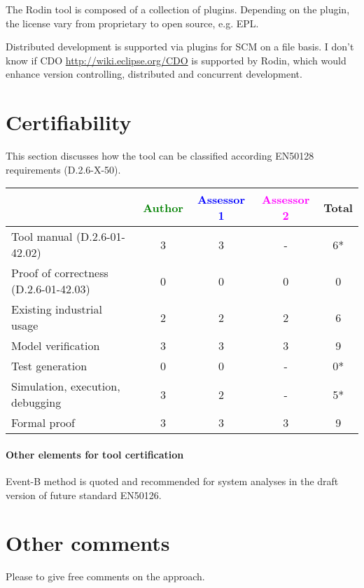 \begin{assessor2}
  The Rodin tool is composed of a collection of plugins. Depending on
  the plugin, the license vary from proprietary to open source,
  e.g. EPL.
\end{assessor2}

\begin{assessor2}
  Distributed development is supported via plugins for SCM on a file
  basis. I don't know if CDO \url{http://wiki.eclipse.org/CDO} is
  supported by Rodin, which would enhance version controlling,
  distributed and concurrent development.
\end{assessor2}

\section{Certifiability}

This section discusses how the tool can be classified according EN50128 requirements (D.2.6-X-50).


\begin{tabular}{|l | c | c | c | c|}
\hline
& \textcolor{green}{Author} & \textcolor{blue}{Assessor 1} & \textcolor{magenta}{Assessor 2} & Total \\
\hline 
Tool manual (D.2.6-01-42.02) & 3 & 3 & - & 6*  \\
\hline
Proof of correctness (D.2.6-01-42.03)   & 0 & 0 & 0 & 0 \\
\hline
Existing industrial usage  & 2 & 2 & 2 & 6 \\
\hline
Model verification & 3 & 3 & 3 & 9 \\
\hline
Test generation & 0 & 0 & - & 0* \\
\hline
Simulation, execution, debugging & 3 & 2 & - & 5* \\
\hline
Formal proof &3  & 3 & 3 & 9 \\
\hline
\end{tabular}

\paragraph{Other elements for tool certification}

\begin{author_comment}
Event-B method is quoted and recommended for system analyses in the draft version of future standard EN50126.

\end{author_comment}

\section{Other comments}
Please to  give free comments on the approach.



